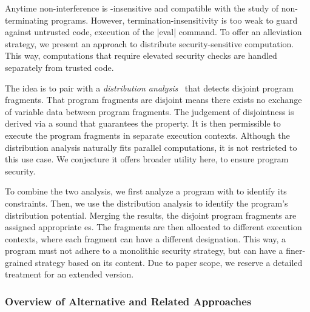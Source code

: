 Anytime non-interference is
-insensitive
and compatible with the study of non-terminating programs. However,
termination-insensitivity is too weak to guard against untrusted code, \eg
execution of the \prc|eval| command. To offer an alleviation strategy, we
present an approach to distribute security-sensitive computation. This way,
computations that require elevated security checks are handled separately from
trusted code.

The idea is to pair \lname with a \emph{distribution
analysis}~\cite{aubert20232} that detects disjoint program fragments. That
program fragments are disjoint means there exists no exchange of variable data
between program fragments. The judgement of disjointness is derived via a sound
 that guarantees the property. It is then permissible to
execute the program fragments in separate execution contexts. Although the
distribution analysis naturally fits parallel computations, it is not restricted
to this use case. We conjecture it offers broader utility here, to ensure
program security.

To combine the two analysis, we first analyze a program with \lname to identify
its  constraints. Then, we use the distribution analysis
to identify the program's distribution potential. Merging the results, the
disjoint program fragments are assigned appropriate es. The
fragments are then allocated to different execution contexts, where each
fragment can have a different  designation. This way, a
program must not adhere to a monolithic security strategy, but can have a
finer-grained strategy based on its content. Due to paper scope, we reserve a
detailed treatment for an extended version.

\subsubsection{Overview of Alternative and Related Approaches}
\label{sec:ni-related-works}

